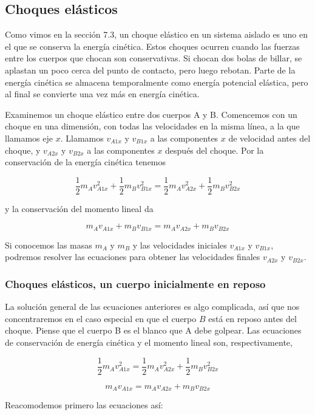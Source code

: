 \documentclass{article}
\newcommand{\newsubsection}[1]{
    \vspace{0.5cm}
    \color{sectionColor}
    \subsection{\bl{#1}}
    \color{black}
    \vspace{0.5cm}
}
\newcommand{\newtitle}[1]{
    \color{titleColor}
    \subsubsection{#1}
    \color{black}
}
\newcommand{\bl}[1]{\textbf{#1}}
\begin{document}
    \newsubsection{Choques elásticos}

    \par Como vimos en la sección 7.3, un choque elástico en un sistema aislado es uno en el que se conserva la energía cinética. Estos choques ocurren cuando las fuerzas entre los cuerpos que chocan son conservativas. Si chocan dos bolas de billar, se aplastan un poco cerca del punto de contacto, pero luego rebotan. Parte de la energía cinética se almacena temporalmente como energía potencial elástica, pero al ﬁnal se convierte una vez más en energía cinética.

    \par Examinemos un choque elástico entre dos cuerpos A y B. Comencemos con un choque en una dimensión, con todas las velocidades en la misma línea, a la que llamamos eje $x$. Llamamos $v_{A1x}$ y $v_{B1x}$ a las componentes $x$ de velocidad antes del choque, y $v_{A2x}$ y $v_{B2x}$ a las componentes $x$ después del choque. Por la conservación de la energía cinética tenemos

    \[ \frac{1}{2} m_A v_{A1x}^2 + \frac{1}{2} m_B v_{B1x}^2 = \frac{1}{2} m_A v_{A2x}^2 + \frac{1}{2} m_B v_{B2x}^2 \]

    \par y la conservación del momento lineal da

    \[ m_A v_{A1x} + m_B v_{B1x} = m_A v_{A2x} + m_B v_{B2x} \]

    \par Si conocemos las masas $m_A$ y $m_B$ y las velocidades iniciales $v_{A1x}$ y $v_{B1x}$, podremos resolver las ecuaciones para obtener las velocidades ﬁnales $v_{A2x}$ y $v_{B2x}$.

    \newtitle{Choques elásticos, un cuerpo inicialmente en reposo}

    \par La solución general de las ecuaciones anteriores es algo complicada, así que nos concentraremos en el caso especial en que el cuerpo $B$ está en reposo antes del choque. Piense que el cuerpo B es el blanco que A debe golpear. Las ecuaciones de conservación de energía cinética y el momento lineal son, respectivamente,

    \[ \frac{1}{2} m_A v_{A1x}^2 = \frac{1}{2} m_A v_{A2x}^2 + \frac{1}{2} m_B v_{B2x}^2 \]

    \[ m_A v_{A1x} = m_A v_{A2x} + m_B v_{B2x} \]

    \par Reacomodemos primero las ecuaciones así:
\end{document}

